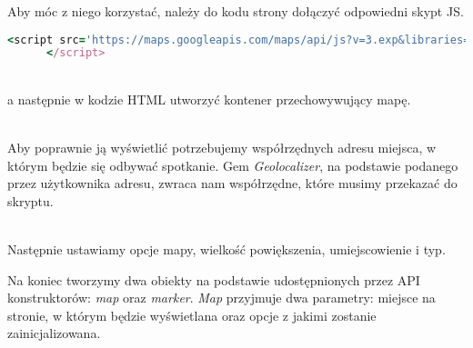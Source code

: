 Aby móc z niego korzystać, należy do kodu strony dołączyć odpowiedni skypt JS.
\begin{code}
  \begin{lstlisting}[language=Ruby, basicstyle=\ttfamily\scriptsize, showstringspaces=false]
      <script src='https://maps.googleapis.com/maps/api/js?v=3.exp&libraries=places'>
      </script>
  \end{lstlisting}
\end{code}\\

a następnie w kodzie HTML utworzyć kontener przechowywujący mapę.
\begin{code}
  
\end{code}\\

Aby poprawnie ją wyświetlić potrzebujemy współrzędnych adresu miejsca, w~ którym będzie się odbywać spotkanie. Gem \emph{Geolocalizer}, na podstawie podanego przez użytkownika adresu, zwraca nam współrzędne, które musimy przekazać do skryptu.

\begin{code}
  
\end{code}\\

Następnie ustawiamy opcje mapy, wielkość powiększenia, umiejscowienie i typ.

Na koniec tworzymy dwa obiekty na podstawie udostępnionych przez API konstruktorów: \emph{map} oraz \emph{marker}. \emph{Map} przyjmuje dwa parametry: miejsce na stronie, w którym będzie wyświetlana oraz opcje z jakimi zostanie zainicjalizowana.
